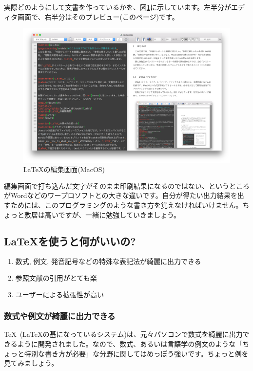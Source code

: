 \documentclass[xelatex,a4paper,base=11pt,twoside,ja=standard]{bxjsarticle}
\begin{document}
実際どのようにして文書を作っているかを、図\ref{intro}に示しています。左半分がエディタ画面で、右半分はそのプレビュー(このページ)です。
\begin{figure}[H]
\centering
\includegraphics[width=150truemm]{intro}
\caption{\LaTeX の編集画面(MacOS)}
\label{intro}
\end{figure}
編集画面で打ち込んだ文字がそのまま印刷結果になるのではない、というところがWordなどのワープロソフトとの大きな違いです。自分が得たい出力結果を出すためには、このプログラミングのような書き方を覚えなければいけません。ちょっと敷居は高いですが、一緒に勉強していきましょう。

\subsection{\LaTeX を使うと何がいいの?}
\begin{screen}
\begin{enumerate}
\item 数式, 例文, 発音記号などの特殊な表記法が綺麗に出力できる
\item 参照文献の引用がとても楽
\item ユーザーによる拡張性が高い
\end{enumerate}
\end{screen}

\subsubsection{数式や例文が綺麗に出力できる}
\TeX~(\LaTeX の基になっているシステム)は、元々パソコンで数式を綺麗に出力できるように開発されました。なので、数式、あるいは言語学の例文のような「ちょっと特別な書き方が必要」な分野に関してはめっぽう強いです。ちょっと例を見てみましょう。
\end{document}
